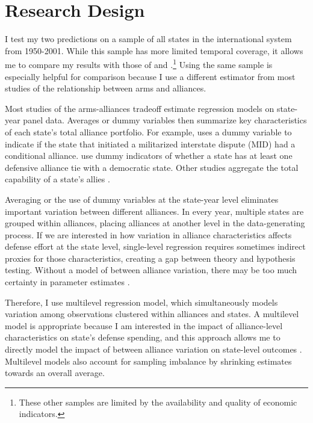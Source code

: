 \documentclass[12pt]{article}
\begin{document}
\section*{Research Design} 

I test my two predictions on a sample of all states in the international system from 1950-2001. While this sample has more limited temporal coverage, it allows me to compare my results with those of \citet{DigiuseppePoast2016} and \citet{Nordhausetal2012}.\footnote{These other samples are limited by the availability and quality of economic indicators.} Using the same sample is especially helpful for comparison because I use a different estimator from most studies of the relationship between arms and alliances. 

Most studies of the arms-alliances tradeoff estimate regression models on state-year panel data. Averages or dummy variables then summarize key characteristics of each state's total alliance portfolio. For example, \citet{Benson2012} uses a dummy variable to indicate if the state that initiated a militarized interstate dispute (MID) had a conditional alliance. \citet{DigiuseppePoast2016} use dummy indicators of whether a state has at least one defensive alliance tie with a democratic state. Other studies aggregate the total capability of a state's allies \citep{Nordhausetal2012}. 

Averaging or the use of dummy variables at the state-year level eliminates important variation between different alliances. In every year, multiple states are grouped within alliances, placing alliances at another level in the data-generating process. If we are interested in how variation in alliance characteristics affects defense effort at the state level, single-level regression requires sometimes indirect proxies for those characteristics, creating a gap between theory and hypothesis testing. Without a model of between alliance variation, there may be too much certainty in parameter estimates \citep{McElreath2016}. 

Therefore, I use multilevel regression model, which simultaneously models variation among observations clustered within alliances and states. A multilevel model is appropriate because I am interested in the impact of \textsf{alliance-level} characteristics on state's defense spending, and this approach allows me to directly model the impact of between alliance variation on state-level outcomes \citep{GelmanHill2007}. Multilevel models also account for sampling imbalance by shrinking estimates towards an overall average. 
\end{document}
